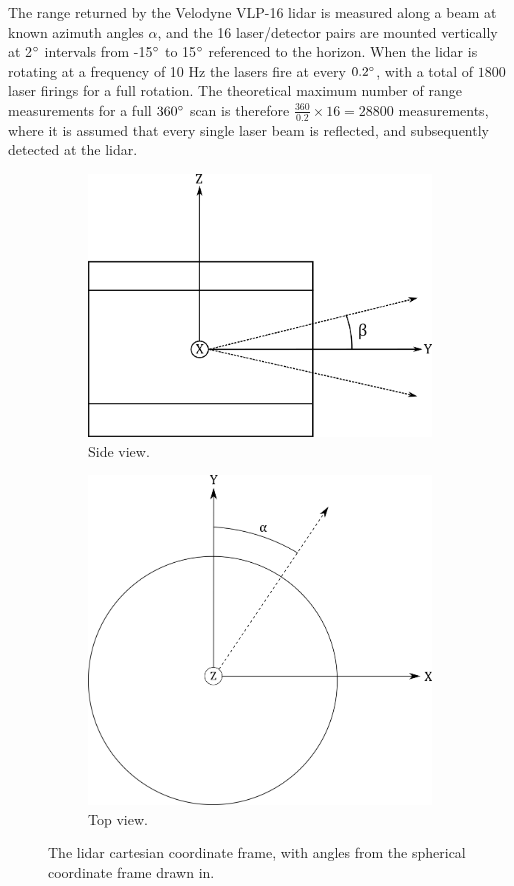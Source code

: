 The range returned by the Velodyne VLP-16 lidar is measured along a beam at known azimuth angles $\alpha$, and the 16 laser/detector pairs are mounted vertically at 2$\degree$ intervals from -15$\degree$ to 15$\degree$ referenced to the horizon. When the lidar is rotating at a frequency of 10 Hz the lasers fire at every $0.2\degree$, with a total of $1800$ laser firings for a full rotation. The theoretical maximum number of range measurements for a full $360\degree$ scan is therefore $\frac{360}{0.2}\times16=28800$ measurements, where it is assumed that every single laser beam is reflected, and subsequently detected at the lidar.
\begin{figure}[H]
	\centering
	\begin{subfigure}{.5\textwidth}
		\centering
		\includegraphics[width=.7\linewidth]{fig/lidar_side.png}
		\caption{Side view.}
		\label{fig:sub_lidarframe}
	\end{subfigure}%
	\begin{subfigure}{.5\textwidth}
		\centering
		\includegraphics[width=.7\linewidth]{fig/lidar_top.png}
		\caption{Top view.}
		\label{fig:sub_lidarframe2}
	\end{subfigure}
	\caption{The lidar cartesian coordinate frame, with angles from the spherical coordinate frame drawn in.}
	\label{fig:lidar_frames}
\end{figure}

